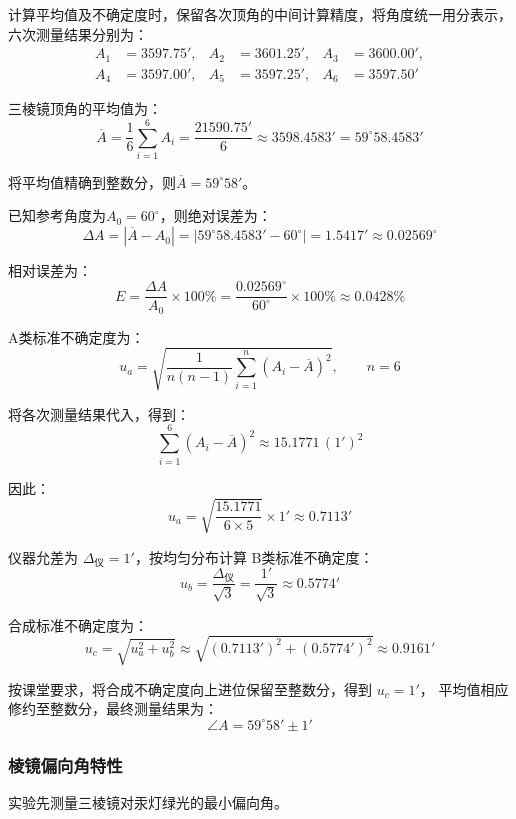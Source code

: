 \documentclass[10pt,a4paper]{ctexart} %
\begin{document}
    计算平均值及不确定度时，保留各次顶角的中间计算精度，将角度统一用分表示，六次测量结果分别为：
    \[
    \begin{aligned}
      A_1&=3597.75', & A_2&=3601.25', & A_3&=3600.00',\\
      A_4&=3597.00', & A_5&=3597.25', & A_6&=3597.50'
    \end{aligned}
    \]

    三棱镜顶角的平均值为：
    \[
    \overline{A}=\frac{1}{6}\sum_{i=1}^{6}A_i
    =\frac{21590.75'}{6}
    \approx3598.4583'=59^\circ58.4583'
    \]

    将平均值精确到整数分，则$\overline{A}=59^\circ58'$。

    已知参考角度为$A_0=60^\circ$，则绝对误差为：
    \[
    \Delta A=|\overline{A}-A_0|
    =|59^\circ58.4583'-60^\circ|
    =1.5417'\approx0.02569^\circ
    \]

    相对误差为：
    \[
    E=\frac{\Delta A}{A_0}\times100\%
    =\frac{0.02569^\circ}{60^\circ}\times100\%
    \approx0.0428\%
    \]

    A类标准不确定度为：
    \[
    u_a=\sqrt{\frac{1}{n(n-1)}\sum_{i=1}^{n}(A_i-\overline{A})^2},
    \qquad n=6
    \]

    将各次测量结果代入，得到：
    \[
    \sum_{i=1}^{6}(A_i-\overline{A})^2
    \approx15.1771\,(1')^2
    \]
    
    因此：
    \[
    u_a=\sqrt{\frac{15.1771}{6\times5}}\times1'
    \approx0.7113'
    \]

    仪器允差为 $\Delta_{\mbox{仪}}=1'$，按均匀分布计算
    B类标准不确定度：
    \[
    u_b=\frac{\Delta_{\mbox{仪}}}{\sqrt{3}}
    =\frac{1'}{\sqrt{3}}\approx0.5774'
    \]

    合成标准不确定度为：
    \[
    u_c=\sqrt{u_a^2+u_b^2}
    \approx\sqrt{(0.7113')^2+(0.5774')^2}
    \approx0.9161'
    \]

    按课堂要求，将合成不确定度向上进位保留至整数分，得到 $u_c=1'$，
    平均值相应修约至整数分，最终测量结果为：
    \[
    \boxed{\angle A=59^\circ58'\pm1'}
    \]

    \subsubsection{棱镜偏向角特性}
    实验先测量三棱镜对汞灯绿光的最小偏向角。
    
\end{document}
